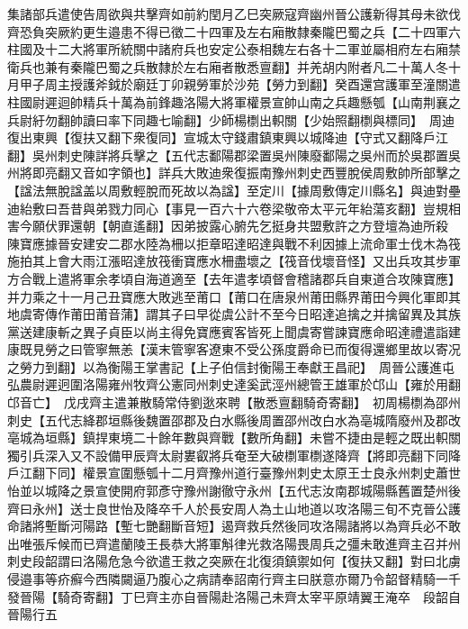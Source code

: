 集諸部兵遣使告周欲與共擊齊如前約閏月乙巳突厥寇齊幽州晉公護新得其母未欲伐齊恐負突厥約更生邉患不得已徵二十四軍及左右廂散隸秦隴巴蜀之兵【二十四軍六柱國及十二大將軍所統關中諸府兵也安定公泰相魏左右各十二軍並屬相府左右廂禁衛兵也兼有秦隴巴蜀之兵散隸於左右廂者散悉亶翻】并羌胡内附者凡二十萬人冬十月甲子周主授護斧鉞於廟廷丁卯親勞軍於沙苑【勞力到翻】癸酉還宫護軍至潼關遣柱國尉遲迴帥精兵十萬為前鋒趣洛陽大將軍權景宣帥山南之兵趣懸瓠【山南荆襄之兵尉紆勿翻帥讀曰率下同趣七喻翻】少師楊檦出軹關【少始照翻檦與標同】　周迪復出東興【復扶又翻下衆復同】宣城太守錢肅鎮東興以城降迪【守式又翻降戶江翻】吳州刺史陳詳將兵擊之【五代志鄱陽郡梁置吳州陳廢鄱陽之吳州而於吳郡置吳州將即亮翻又音如字領也】詳兵大敗迪衆復振南豫州刺史西豐脫侯周敷帥所部擊之【諡法無脫諡盖以周敷輕脫而死故以為諡】至定川【據周敷傳定川縣名】與迪對壘迪紿敷曰吾昔與弟戮力同心【事見一百六十六卷梁敬帝太平元年紿蕩亥翻】豈規相害今願伏罪還朝【朝直遙翻】因弟披露心腑先乞挺身共盟敷許之方登壇為迪所殺　陳寶應據晉安建安二郡水陸為柵以拒章昭達昭達與戰不利因據上流命軍士伐木為筏施拍其上會大雨江漲昭達放筏衝寶應水柵盡壞之【筏音伐壞音怪】又出兵攻其步軍方合戰上遣將軍余孝頃自海道適至【去年遣孝頃督會稽諸郡兵自東道合攻陳寶應】并力乘之十一月己丑寶應大敗逃至莆口【莆口在唐泉州莆田縣界莆田今興化軍即其地虞寄傳作莆田莆音蒲】謂其子曰早從虞公計不至今日昭達追擒之并擒留異及其族黨送建康斬之異子貞臣以尚主得免寶應賓客皆死上聞虞寄嘗諫寶應命昭達禮遣詣建康既見勞之曰管寧無恙【漢末管寧客遼東不受公孫度爵命已而復得還鄉里故以寄况之勞力到翻】以為衡陽王掌書記【上子伯信封衡陽王奉獻王昌祀】　周晉公護進屯弘農尉遲迥圍洛陽雍州牧齊公憲同州刺史達奚武涇州總管王雄軍於邙山【雍於用翻邙音亡】　戊戌齊主遣兼散騎常侍劉逖來聘【散悉亶翻騎奇寄翻】　初周楊檦為邵州刺史【五代志絳郡垣縣後魏置邵郡及白水縣後周置邵州改白水為亳城隋廢州及郡改亳城為垣縣】鎮捍東境二十餘年數與齊戰【數所角翻】未嘗不捷由是輕之既出軹關獨引兵深入又不設備甲辰齊太尉婁叡將兵奄至大破檦軍檦遂降齊【將即亮翻下同降戶江翻下同】權景宣圍懸瓠十二月齊豫州道行臺豫州刺史太原王士良永州刺史蕭世怡並以城降之景宣使開府郭彥守豫州謝徹守永州【五代志汝南郡城陽縣舊置楚州後齊曰永州】送士良世怡及降卒千人於長安周人為土山地道以攻洛陽三旬不克晉公護命諸將塹斷河陽路【塹七艷翻斷音短】遏齊救兵然後同攻洛陽諸將以為齊兵必不敢出唯張斥候而已齊遣蘭陵王長恭大將軍斛律光救洛陽畏周兵之彊未敢進齊主召并州刺史段韶謂曰洛陽危急今欲遣王救之突厥在北復須鎮禦如何【復扶又翻】對曰北虜侵邉事等疥癬今西隣闚逼乃腹心之病請奉詔南行齊主曰朕意亦爾乃令韶督精騎一千發晉陽【騎奇寄翻】丁巳齊主亦自晉陽赴洛陽己未齊太宰平原靖翼王淹卒　段韶自晉陽行五

